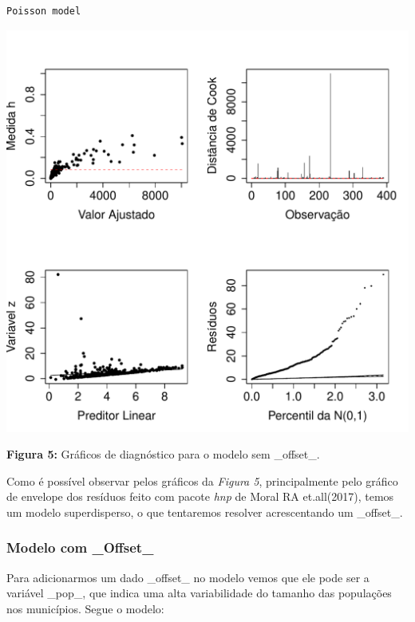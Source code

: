 \documentclass[12pt,a4paper]{article}\usepackage[]{graphicx}\usepackage[]{color}
\makeatletter
\def\maxwidth{ %
  \ifdim\Gin@nat@width>\linewidth
    \linewidth
  \else
    \Gin@nat@width
  \fi
}
\newenvironment{kframe}{%
 \def\at@end@of@kframe{}%
 \ifinner\ifhmode%
  \def\at@end@of@kframe{\end{minipage}}%
  \begin{minipage}{\columnwidth}%
 \fi\fi%
 \def\FrameCommand##1{\hskip\@totalleftmargin \hskip-\fboxsep
 \colorbox{shadecolor}{##1}\hskip-\fboxsep
     \hskip-\linewidth \hskip-\@totalleftmargin \hskip\columnwidth}%
 \MakeFramed {\advance\hsize-\width
   \@totalleftmargin\z@ \linewidth\hsize
   \@setminipage}}%
 {\par\unskip\endMakeFramed%
 \at@end@of@kframe}
\newenvironment{knitrout}{}{} %
\makeatother
\begin{document}
\begin{knitrout}
\color{fgcolor}\begin{kframe}
\begin{verbatim}
Poisson model 
\end{verbatim}
\end{kframe}
\includegraphics[width=\maxwidth]{figure/unnamed-chunk-10-1} 

\end{knitrout}
\textbf{Figura 5:} Gráficos de diagnóstico para o modelo sem \_offset\_.

Como é possível observar pelos gráficos da \emph{Figura 5}, principalmente pelo gráfico de envelope dos resíduos feito com pacote \emph{hnp} de Moral RA et.all(2017), temos um modelo superdisperso, o que tentaremos resolver acrescentando um \_offset\_.

\subsubsection{\textbf{Modelo com \_Offset\_}}

Para adicionarmos um dado \_offset\_ no modelo vemos que ele pode ser a variável \_pop\_, que indica uma alta variabilidade do tamanho das populações nos municípios. Segue o modelo:
\end{document}
